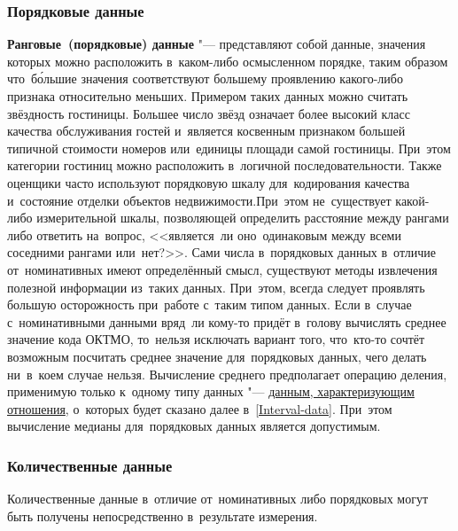 \documentclass[]{scrartcl}
\begin{document}
\subsubsection{Порядковые данные}
\textbf{Ранговые~(порядковые) данные} "--- представляют собой данные, значения которых можно расположить в~каком-либо осмысленном порядке, таким образом что~б\'ольшие значения соответствуют большему проявлению какого-либо признака относительно меньших. Примером таких данных можно считать звёздность гостиницы. Большее число звёзд означает более высокий класс качества обслуживания гостей и~является косвенным признаком большей типичной стоимости номеров или~единицы площади самой гостиницы. При~этом категории гостиниц можно расположить в~логичной последовательности. Также оценщики часто используют порядковую шкалу для~кодирования качества и~состояние отделки объектов недвижимости.При~этом не~существует какой-либо измерительной шкалы, позволяющей определить расстояние между рангами либо ответить на~вопрос, <<является~ли оно~одинаковым между всеми соседними рангами или~нет?>>. Сами числа в~порядковых данных в~отличие от~номинативных имеют определённый смысл, существуют методы извлечения полезной информации из~таких данных. При~этом, всегда следует проявлять большую осторожность при~работе с~таким типом данных. Если в~случае с~номинативными данными вряд~ли кому-то придёт в~голову вычислять среднее значение кода ОКТМО, то~нельзя исключать вариант того, что~кто-то сочтёт возможным посчитать среднее значение для~порядковых данных, чего делать ни~в~коем случае нельзя. Вычисление среднего предполагает операцию деления, применимую только к~одному типу данных "--- \hyperref[Interval-data]{данным, характеризующим отношения}, о~которых будет сказано далее в~\ref{Interval-data}. При~этом вычисление медианы для~порядковых данных является допустимым.
\subsubsection{Количественные данные}
Количественные данные в~отличие от~номинативных либо порядковых могут быть получены непосредственно в~результате измерения. 
\end{document}
